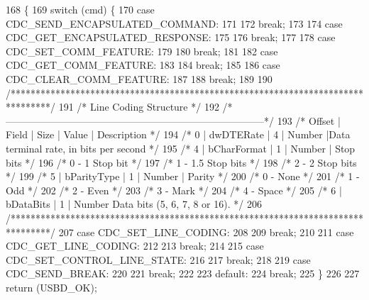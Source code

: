 \begin{DoxyCode}
168 \{ 
169     \textcolor{keywordflow}{switch} (cmd) \{
170     \textcolor{keywordflow}{case} CDC\_SEND\_ENCAPSULATED\_COMMAND:
171  
172         \textcolor{keywordflow}{break};
173 
174     \textcolor{keywordflow}{case} CDC\_GET\_ENCAPSULATED\_RESPONSE:
175  
176         \textcolor{keywordflow}{break};
177 
178     \textcolor{keywordflow}{case} CDC\_SET\_COMM\_FEATURE:
179  
180         \textcolor{keywordflow}{break};
181 
182     \textcolor{keywordflow}{case} CDC\_GET\_COMM\_FEATURE:
183 
184         \textcolor{keywordflow}{break};
185 
186     \textcolor{keywordflow}{case} CDC\_CLEAR\_COMM\_FEATURE:
187 
188         \textcolor{keywordflow}{break};
189 
190 \textcolor{comment}{/********************************************************************************/}
191 \textcolor{comment}{/* Line Coding Structure                            */}
192 \textcolor{comment}{/*------------------------------------------------------------------------------*/}
193 \textcolor{comment}{/* Offset | Field       | Size | Value  | Description               */}
194 \textcolor{comment}{/* 0      | dwDTERate   |   4  | Number |Data terminal rate, in bits per second */}
195 \textcolor{comment}{/* 4      | bCharFormat |   1  | Number | Stop bits             */}
196 \textcolor{comment}{/*                  0 - 1 Stop bit              */}
197 \textcolor{comment}{/*                  1 - 1.5 Stop bits           */}
198 \textcolor{comment}{/*                  2 - 2 Stop bits             */}
199 \textcolor{comment}{/* 5      | bParityType |  1   | Number | Parity                */}
200 \textcolor{comment}{/*                  0 - None                */}
201 \textcolor{comment}{/*                  1 - Odd                 */}
202 \textcolor{comment}{/*                  2 - Even                */}
203 \textcolor{comment}{/*                  3 - Mark                */}
204 \textcolor{comment}{/*                  4 - Space               */}
205 \textcolor{comment}{/* 6      | bDataBits  |   1   | Number Data bits (5, 6, 7, 8 or 16).       */}
206 \textcolor{comment}{/********************************************************************************/}
207     \textcolor{keywordflow}{case} CDC\_SET\_LINE\_CODING:   
208     
209         \textcolor{keywordflow}{break};
210 
211     \textcolor{keywordflow}{case} CDC\_GET\_LINE\_CODING:     
212 
213         \textcolor{keywordflow}{break};
214 
215     \textcolor{keywordflow}{case} CDC\_SET\_CONTROL\_LINE\_STATE:
216 
217         \textcolor{keywordflow}{break};
218 
219     \textcolor{keywordflow}{case} CDC\_SEND\_BREAK:
220  
221         \textcolor{keywordflow}{break};    
222     
223     \textcolor{keywordflow}{default}:
224         \textcolor{keywordflow}{break};
225     \}     
226 
227     \textcolor{keywordflow}{return} (USBD\_OK);
\end{DoxyCode}
\mbox{\label{group___s_d___u_s_b___c_d_c___i_f___functions_gad9f46346272b91f23250ef22b6a1e600}} 
